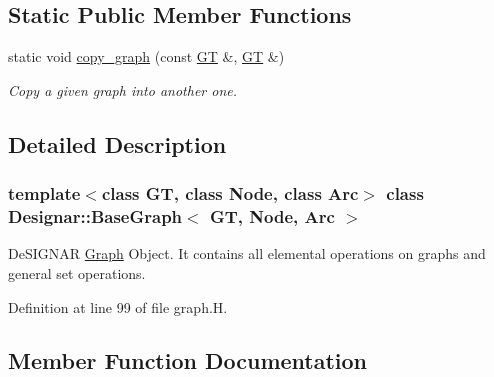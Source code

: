 \subsection*{Static Public Member Functions}
\begin{DoxyCompactItemize}
\item 
static void \hyperlink{class_designar_1_1_base_graph_ac34a3b513973c2ed43067934f71ace28}{copy\+\_\+graph} (const \hyperlink{demo-buildgraph_8_c_a3001c40d2c31ca87ed96cd7d1334a55e}{GT} \&, \hyperlink{demo-buildgraph_8_c_a3001c40d2c31ca87ed96cd7d1334a55e}{GT} \&)
\begin{DoxyCompactList}\small\item\em Copy a given graph into another one. \end{DoxyCompactList}\end{DoxyCompactItemize}


\subsection{Detailed Description}
\subsubsection*{template$<$class GT, class Node, class Arc$>$\newline
class Designar\+::\+Base\+Graph$<$ G\+T, Node, Arc $>$}

De\+S\+I\+G\+N\+AR \hyperlink{class_designar_1_1_graph}{Graph} Object. It contains all elemental operations on graphs and general set operations. 

Definition at line 99 of file graph.\+H.



\subsection{Member Function Documentation}
\mbox{\label{class_designar_1_1_base_graph_a128e77ef80ed0a40bf307ea06736664b}} 
